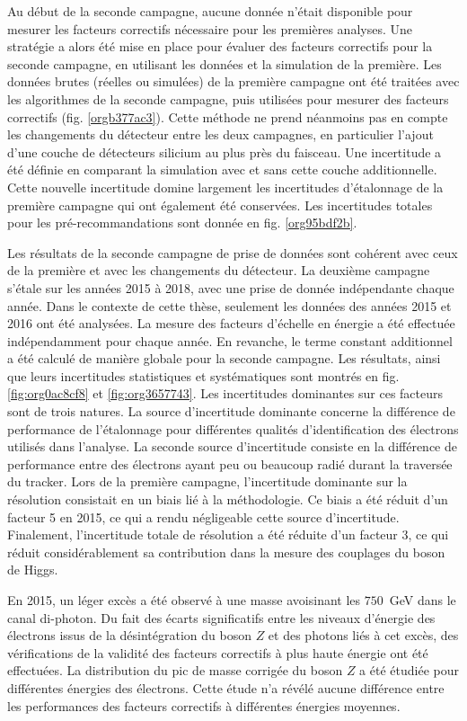 Au début de la seconde campagne, aucune donnée n'était disponible pour mesurer les facteurs correctifs nécessaire pour les premières analyses.
Une stratégie a alors été mise en place pour évaluer des facteurs correctifs pour la seconde campagne, en utilisant les données et la simulation de la première.
Les données brutes (réelles ou simulées) de la première campagne ont été traitées avec les algorithmes de la seconde campagne, puis utilisées pour mesurer des facteurs correctifs (fig. \ref{orgb377ac3}).
Cette méthode ne prend néanmoins pas en compte les changements du détecteur entre les deux campagnes, en particulier l'ajout d'une couche de détecteurs silicium au plus près du faisceau.
Une incertitude a été définie en comparant la simulation avec et sans cette couche additionnelle.
Cette nouvelle incertitude  domine largement les incertitudes d'étalonnage de la première campagne qui ont également été conservées.
Les incertitudes totales pour les pré-recommandations sont donnée en fig. \ref{org95bdf2b}.


Les résultats de la seconde campagne de prise de données sont cohérent avec ceux de la première et avec les changements du détecteur.
La deuxième campagne s'étale sur les années 2015 à 2018, avec une prise de donnée indépendante chaque année.
Dans le contexte de cette thèse, seulement les données des années 2015 et 2016 ont été analysées.
La mesure des facteurs d'échelle en énergie a été effectuée indépendamment pour chaque année.
En revanche, le terme constant additionnel a été calculé de manière globale pour la seconde campagne.
Les résultats, ainsi que leurs incertitudes statistiques et systématiques sont montrés en fig. \ref{fig:org0ac8cf8} et \ref{fig:org3657743}.
Les incertitudes dominantes sur ces facteurs sont de trois natures.
La source d'incertitude dominante concerne la différence de performance de l'étalonnage pour différentes qualités d'identification des électrons utilisés dans l'analyse.
La seconde source d'incertitude consiste en la différence de performance entre des électrons ayant peu ou beaucoup radié durant la traversée du tracker.
Lors de la première campagne, l'incertitude dominante sur la résolution consistait en un biais lié à la méthodologie.
Ce biais a été réduit d'un facteur 5 en 2015, ce qui a rendu négligeable cette source d'incertitude.
Finalement, l'incertitude totale de résolution a été réduite d'un facteur 3, ce qui réduit considérablement sa contribution dans la mesure des couplages du boson de Higgs.

En 2015, un léger excès a été observé à une masse avoisinant les $750$~GeV dans le canal di-photon.
Du fait des écarts significatifs entre les niveaux d'énergie des électrons issus de la désintégration du boson $Z$ et des photons liés à cet excès, des vérifications de la validité des facteurs correctifs à plus haute énergie ont été effectuées.
La distribution du pic de masse corrigée du boson $Z$ a été étudiée pour différentes énergies des électrons.
Cette étude n'a révélé aucune différence entre les performances des facteurs correctifs à différentes énergies moyennes.

